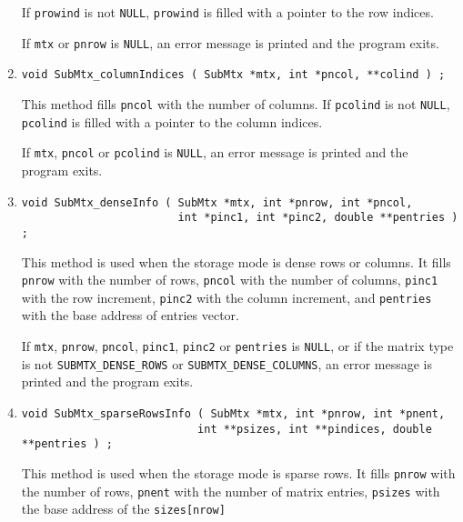 \begin{enumerate}
If {\tt prowind} is not {\tt NULL}, {\tt *prowind} is filled with 
a pointer to the row indices.
\par {}
If {\tt mtx} or {\tt pnrow} is {\tt NULL},
an error message is printed and the program exits.
\item
\begin{verbatim}
void SubMtx_columnIndices ( SubMtx *mtx, int *pncol, **colind ) ;
\end{verbatim}
This method fills {\tt *pncol} with the number of columns.
If {\tt pcolind} is not {\tt NULL}, {\tt *pcolind} is filled with 
a pointer to the column indices.
\par {}
If {\tt mtx}, {\tt pncol} or {\tt pcolind} is {\tt NULL},
an error message is printed and the program exits.
\item
\begin{verbatim}
void SubMtx_denseInfo ( SubMtx *mtx, int *pnrow, int *pncol, 
                        int *pinc1, int *pinc2, double **pentries ) ;
\end{verbatim}
This method is used when the storage mode is dense rows or columns.
It fills
{\tt *pnrow} with the number of rows,
{\tt *pncol} with the number of columns,
{\tt *pinc1} with the row increment,
{\tt *pinc2} with the column increment,
and {\tt *pentries} with the base address of entries vector.
\par {}
If {\tt mtx}, {\tt pnrow}, {\tt pncol}, {\tt pinc1}, {\tt pinc2} or
{\tt pentries} is {\tt NULL},
or if the matrix type is not {\tt SUBMTX\_DENSE\_ROWS}
or {\tt SUBMTX\_DENSE\_COLUMNS},
an error message is printed and the program exits.
\item
\begin{verbatim}
void SubMtx_sparseRowsInfo ( SubMtx *mtx, int *pnrow, int *pnent, 
                           int **psizes, int **pindices, double **pentries ) ;
\end{verbatim}
This method is used when the storage mode is sparse rows.
It fills
{\tt *pnrow} with the number of rows,
{\tt *pnent} with the number of matrix entries,
{\tt *psizes} with the base address of the {\tt sizes[nrow]}

\end{enumerate}
